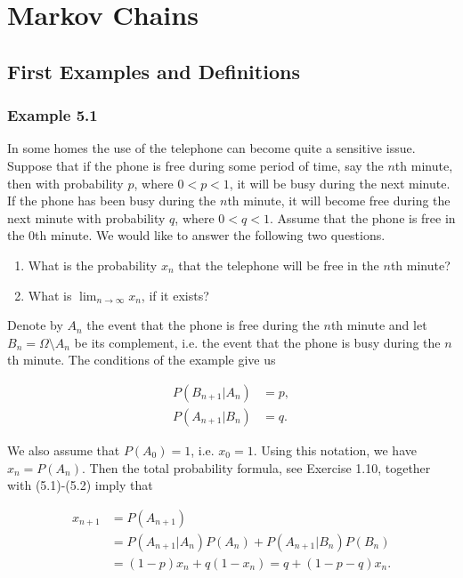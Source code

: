 \chapter{Markov Chains}
\label{chap:markov-chains}

\section{First Examples and Definitions}
\label{sec:first-examples-definitions}

\subsection{Example 5.1}
\label{exm:telephone-markov}

In some homes the use of the telephone can become quite a sensitive issue. Suppose that if the phone is free during some period of time, say the $n$th minute, then with probability $p$, where $0 < p < 1$, it will be busy during the next minute. If the phone has been busy during the $n$th minute, it will become free during the next minute with probability $q$, where $0 < q < 1$. Assume that the phone is free in the 0th minute. We would like to answer the following two questions.

\begin{enumerate}
\item What is the probability $x_{n}$ that the telephone will be free in the $n$th minute?
\item What is $\lim_{n\to \infty}x_n$, if it exists?
\end{enumerate}

Denote by $A_{n}$ the event that the phone is free during the $n$th minute and let $B_{n} = \Omega \setminus A_{n}$ be its complement, i.e. the event that the phone is busy during the $n$th minute. The conditions of the example give us

\begin{align}
P(B_{n+1} | A_{n}) & = p, \tag{5.1} \\
P(A_{n+1} | B_{n}) & = q. \tag{5.2}
\end{align}

We also assume that $P(A_0) = 1$, i.e. $x_0 = 1$. Using this notation, we have $x_n = P(A_n)$. Then the total probability formula, see Exercise 1.10, together with (5.1)-(5.2) imply that

\begin{align}
x_{n+1} &= P(A_{n+1}) \tag{5.3} \\
&= P(A_{n+1} | A_{n}) P(A_{n}) + P(A_{n+1} | B_{n}) P(B_{n}) \\
&= (1-p) x_n + q(1-x_n) = q + (1-p-q) x_n.
\end{align}

